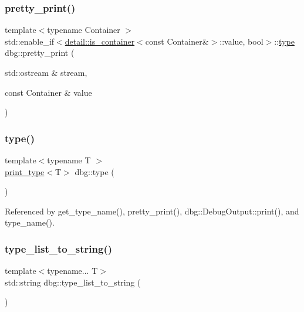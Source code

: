 \mbox{\label{namespacedbg_a1212dc990d58f20efcf5d66eb4a5781c}} 
\subsubsection{\texorpdfstring{pretty\+\_\+print()}{pretty\_print()}\hspace{0.1cm}{\footnotesize\ttfamily [19/19]}}
{\footnotesize\ttfamily template$<$typename Container $>$ \\
std\+::enable\+\_\+if$<$\hyperlink{structdbg_1_1detail_1_1is__container}{detail\+::is\+\_\+container}$<$const Container\&$>$\+::value, bool$>$\+::\hyperlink{namespacedbg_a2365d80e3a3525e6025040383ff8661b}{type} dbg\+::pretty\+\_\+print (\begin{DoxyParamCaption}\item[{std\+::ostream \&}]{stream,  }\item[{const Container \&}]{value }\end{DoxyParamCaption})\hspace{0.3cm}{\ttfamily [inline]}}

\mbox{\label{namespacedbg_a2365d80e3a3525e6025040383ff8661b}} 
\subsubsection{\texorpdfstring{type()}{type()}}
{\footnotesize\ttfamily template$<$typename T $>$ \\
\hyperlink{structdbg_1_1print__type}{print\+\_\+type}$<$T$>$ dbg\+::type (\begin{DoxyParamCaption}{ }\end{DoxyParamCaption})}



Referenced by get\+\_\+type\+\_\+name(), pretty\+\_\+print(), dbg\+::\+Debug\+Output\+::print(), and type\+\_\+name().

\mbox{\label{namespacedbg_aef0097e53230ee373eaabc4981048cac}} 
\subsubsection{\texorpdfstring{type\+\_\+list\+\_\+to\+\_\+string()}{type\_list\_to\_string()}}
{\footnotesize\ttfamily template$<$typename... T$>$ \\
std\+::string dbg\+::type\+\_\+list\+\_\+to\+\_\+string (\begin{DoxyParamCaption}{ }\end{DoxyParamCaption})}



